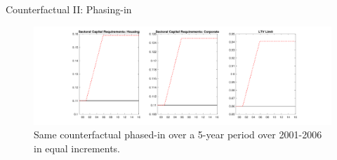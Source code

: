 \documentclass[8pt,aspectratio=169]{beamer}
\numberwithin{equation}{section}
\begin{document}



\begin{frame}{Counterfactual II: Phasing-in}



\begin{figure}[H]
\centering
\caption{Same counterfactual phased-in over a 5-year period over 2001-2006 in equal increments.}
\includegraphics[scale=0.35]{CF_policy_rules10.pdf}

\end{figure}


\end{frame}
\end{document}
